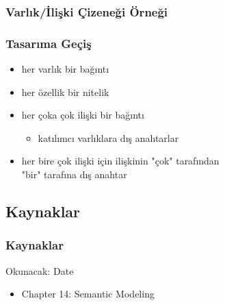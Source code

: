\documentclass[dvipsnames]{beamer}
\theoremstyle{theorem}
\begin{document}
\begin{frame}
  \frametitle{Varlık/İlişki Çizeneği Örneği}

  \begin{center}
  \end{center}
\end{frame}

\begin{frame}
  \frametitle{Tasarıma Geçiş}

  \begin{itemize}
    \item her varlık bir bağıntı

    \pause
    \item her özellik bir nitelik

    \pause
    \item her çoka çok ilişki bir bağıntı
    \begin{itemize}
      \item katılımcı varlıklara dış anahtarlar
    \end{itemize}

    \pause
    \item her bire çok ilişki için ilişkinin "çok" tarafından\\
      "bir" tarafına dış anahtar
 \end{itemize}
\end{frame}

\subsection*{Kaynaklar}

\begin{frame}
  \frametitle{Kaynaklar}

  \begin{block}{Okunacak: Date}
    \begin{itemize}
      \item Chapter 14: \alert{Semantic Modeling}
    \end{itemize}
  \end{block}
\end{frame}
\end{document}
